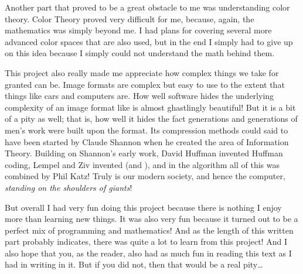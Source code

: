 Another part that proved to be a great obstacle to me was
understanding color theory. Color Theory proved very difficult for me,
because, again, the mathematics was simply beyond me. I had plans for
covering several more advanced color spaces that are also used, but in
the end I simply had to give up on this idea because I simply could
not understand the math behind them.

This project also really made me appreciate how complex things we take
for granted can be. Image formats are complex but easy to use to the
extent that things like cars and computers are. How well software
hides the underlying complexity of an image format like \png is almost
ghastlingly beautiful! But it is a bit of a pity as well; that is, how
well it hides the fact generations and generations of men's work were
built upon the format. Its compression methods could said to have been
started by Claude Shannon when he created the area of Information
Theory. Building on Shannon's early work, David Huffman invented
Huffman coding, Lempel and Ziv invented \lzone(and \lztwo), and in the
 algorithm all of this was combined by Phil Katz! Truly is our
modern society, and hence the computer, \textit{standing on the
  shoulders of giants}!


But overall I had very fun doing this project because there is nothing
I enjoy more than learning new things. It was also very fun because it
turned out to be a perfect mix of programming and mathematics! And as
the length of this written part probably indicates, there was quite a
lot to learn from this project! And I also hope that you, as the
reader, also had as much fun in reading this text as I had in writing
in it. But if you did not, then that would be a real pity\dots
